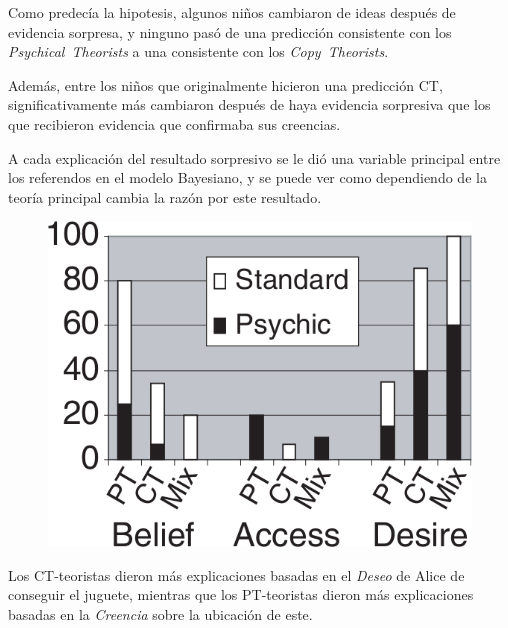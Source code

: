 \documentclass{beamer}
\begin{document}
\begin{frame}
Como predecía la hipotesis, algunos niños cambiaron de ideas después de evidencia sorpresa, y ninguno pasó de una predicción consistente con los \textit{Psychical~Theorists} a una consistente con los \textit{Copy~Theorists}.

Además, entre los niños que originalmente hicieron una predicción CT, significativamente más cambiaron después de haya evidencia sorpresiva que los que recibieron evidencia que confirmaba sus creencias.

\end{frame}

\begin{frame}
A cada explicación del resultado sorpresivo se le dió una variable principal entre los referendos en el modelo Bayesiano, y se puede ver como dependiendo de la teoría principal cambia la razón por este resultado.

\begin{figure}
\includegraphics[height=.45\textheight]{imagenes/resultados_belief.png}
\end{figure}

\vspace{-1em}

Los CT-teoristas dieron más explicaciones basadas en el \textit{Deseo} de Alice de conseguir el juguete, mientras que los PT-teoristas dieron más explicaciones basadas en la \textit{Creencia} sobre la ubicación de este.
\end{frame}
\end{document}
